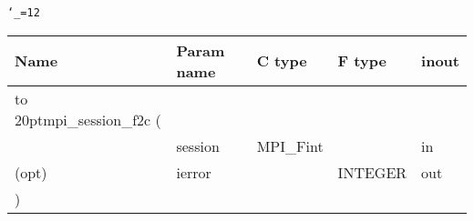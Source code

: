 \begingroup\tt\catcode`\_=12
\begin{tabular}{lllll}
\toprule
\textrm{Name}&\textrm{Param name}&\textrm{C type}&\textrm{F type}&\textrm{inout}\\
\midrule
\hbox to 20pt{mpi_session_f2c (\hss} \\
&session&MPI_Fint&&in\\
(opt)&ierror&&INTEGER&out\\
)\\
\bottomrule
\end{tabular}
\endgroup

